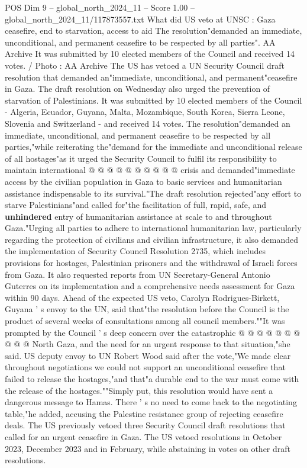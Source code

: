 \begin{textsample}{POS Dim 9 – global\_north\_2024\_11 – Score 1.00 – global\_north\_2024\_11/117873557.txt}  \label{ex:f9_pos_405}
What did US veto at UNSC : Gaza ceasefire, end to starvation, access to aid The resolution"demanded an immediate, unconditional, and permanent ceasefire to be respected by all parties".
AA Archive It was submitted by 10 elected members of the Council and received 14 votes. / Photo : AA Archive The US has vetoed a UN Security Council draft resolution that demanded an"immediate, unconditional, and permanent"ceasefire in Gaza.
The draft resolution on Wednesday also urged the prevention of starvation of Palestinians.
It was submitted by 10 elected members of the Council - Algeria, Ecuador, Guyana, Malta, Mozambique, South Korea, Sierra Leone, Slovenia and Switzerland - and received 14 votes.
The resolution"demanded an immediate, unconditional, and permanent ceasefire to be respected by all parties,"while reiterating the"demand for the immediate and unconditional release of all hostages"as it urged the Security Council to fulfil its responsibility to maintain international @ @ @ @ @ @ @ @ @ @ crisis and demanded"immediate access by the civilian population in Gaza to basic services and humanitarian assistance indispensable to its survival."The draft resolution rejected"any effort to starve Palestinians"and called for"the facilitation of full, rapid, safe, and \textbf{unhindered} entry of humanitarian assistance at scale to and throughout Gaza."Urging all parties to adhere to international humanitarian law, particularly regarding the protection of civilians and civilian infrastructure, it also demanded the implementation of Security Council Resolution 2735, which includes provisions for hostages, Palestinian prisoners and the withdrawal of Israeli forces from Gaza.
It also requested reports from UN Secretary-General Antonio Guterres on its implementation and a comprehensive needs assessment for Gaza within 90 days.
Ahead of the expected US veto, Carolyn Rodrigues-Birkett, Guyana ' s envoy to the UN, said that"the resolution before the Council is the product of several weeks of consultations among all council members.""It was prompted by the Council ' s deep concern over the catastrophic @ @ @ @ @ @ @ @ @ @ North Gaza, and the need for an urgent response to that situation,"she said.
US deputy envoy to UN Robert Wood said after the vote,"We made clear throughout negotiations we could not support an unconditional ceasefire that failed to release the hostages,"and that"a durable end to the war must come with the release of the hostages.""Simply put, this resolution would have sent a dangerous message to Hamas.
There ' s no need to come back to the negotiating table,"he added, accusing the Palestine resistance group of rejecting ceasefire deals.
The US previously vetoed three Security Council draft resolutions that called for an urgent ceasefire in Gaza.
The US vetoed resolutions in October 2023, December 2023 and in February, while abstaining in votes on other draft resolutions.

\end{textsample}
